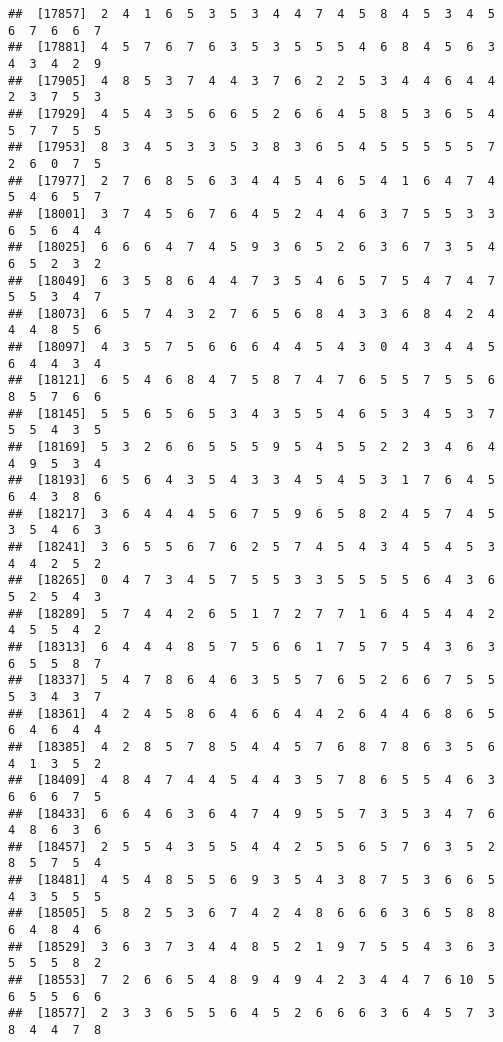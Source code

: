 \documentclass[
]{book}
\begin{document}
\begin{verbatim}
##  [17857]  2  4  1  6  5  3  5  3  4  4  7  4  5  8  4  5  3  4  5  6  7  6  6  7
##  [17881]  4  5  7  6  7  6  3  5  3  5  5  5  4  6  8  4  5  6  3  4  3  4  2  9
##  [17905]  4  8  5  3  7  4  4  3  7  6  2  2  5  3  4  4  6  4  4  2  3  7  5  3
##  [17929]  4  5  4  3  5  6  6  5  2  6  6  4  5  8  5  3  6  5  4  5  7  7  5  5
##  [17953]  8  3  4  5  3  3  5  3  8  3  6  5  4  5  5  5  5  5  7  2  6  0  7  5
##  [17977]  2  7  6  8  5  6  3  4  4  5  4  6  5  4  1  6  4  7  4  5  4  6  5  7
##  [18001]  3  7  4  5  6  7  6  4  5  2  4  4  6  3  7  5  5  3  3  6  5  6  4  4
##  [18025]  6  6  6  4  7  4  5  9  3  6  5  2  6  3  6  7  3  5  4  6  5  2  3  2
##  [18049]  6  3  5  8  6  4  4  7  3  5  4  6  5  7  5  4  7  4  7  5  5  3  4  7
##  [18073]  6  5  7  4  3  2  7  6  5  6  8  4  3  3  6  8  4  2  4  4  4  8  5  6
##  [18097]  4  3  5  7  5  6  6  6  4  4  5  4  3  0  4  3  4  4  5  6  4  4  3  4
##  [18121]  6  5  4  6  8  4  7  5  8  7  4  7  6  5  5  7  5  5  6  8  5  7  6  6
##  [18145]  5  5  6  5  6  5  3  4  3  5  5  4  6  5  3  4  5  3  7  5  5  4  3  5
##  [18169]  5  3  2  6  6  5  5  5  9  5  4  5  5  2  2  3  4  6  4  4  9  5  3  4
##  [18193]  6  5  6  4  3  5  4  3  3  4  5  4  5  3  1  7  6  4  5  6  4  3  8  6
##  [18217]  3  6  4  4  4  5  6  7  5  9  6  5  8  2  4  5  7  4  5  3  5  4  6  3
##  [18241]  3  6  5  5  6  7  6  2  5  7  4  5  4  3  4  5  4  5  3  4  4  2  5  2
##  [18265]  0  4  7  3  4  5  7  5  5  3  3  5  5  5  5  6  4  3  6  5  2  5  4  3
##  [18289]  5  7  4  4  2  6  5  1  7  2  7  7  1  6  4  5  4  4  2  4  5  5  4  2
##  [18313]  6  4  4  4  8  5  7  5  6  6  1  7  5  7  5  4  3  6  3  6  5  5  8  7
##  [18337]  5  4  7  8  6  4  6  3  5  5  7  6  5  2  6  6  7  5  5  5  3  4  3  7
##  [18361]  4  2  4  5  8  6  4  6  6  4  4  2  6  4  4  6  8  6  5  6  4  6  4  4
##  [18385]  4  2  8  5  7  8  5  4  4  5  7  6  8  7  8  6  3  5  6  4  1  3  5  2
##  [18409]  4  8  4  7  4  4  5  4  4  3  5  7  8  6  5  5  4  6  3  6  6  6  7  5
##  [18433]  6  6  4  6  3  6  4  7  4  9  5  5  7  3  5  3  4  7  6  4  8  6  3  6
##  [18457]  2  5  5  4  3  5  5  4  4  2  5  5  6  5  7  6  3  5  2  8  5  7  5  4
##  [18481]  4  5  4  8  5  5  6  9  3  5  4  3  8  7  5  3  6  6  5  4  3  5  5  5
##  [18505]  5  8  2  5  3  6  7  4  2  4  8  6  6  6  3  6  5  8  8  6  4  8  4  6
##  [18529]  3  6  3  7  3  4  4  8  5  2  1  9  7  5  5  4  3  6  3  5  5  5  8  2
##  [18553]  7  2  6  6  5  4  8  9  4  9  4  2  3  4  4  7  6 10  5  6  5  5  6  6
##  [18577]  2  3  3  6  5  5  6  4  5  2  6  6  6  3  6  4  5  7  3  8  4  4  7  8

\end{verbatim}
\end{document}
